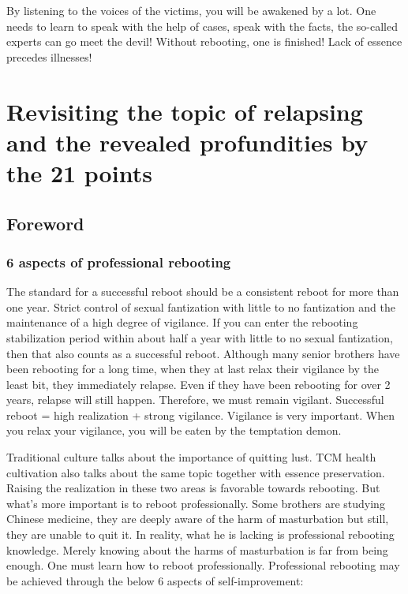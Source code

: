 \documentclass[
]{book}
\begin{document}
By listening to the voices of the victims, you will be awakened by a lot. One needs to learn to speak with the help of cases, speak with the facts, the so-called experts can go meet the devil! Without rebooting, one is finished! Lack of essence precedes illnesses!

\hypertarget{revisiting-the-topic-of-relapsing-and-the-revealed-profundities-by-the-21-points}{%
\chapter{Revisiting the topic of relapsing and the revealed profundities by the 21 points}\label{revisiting-the-topic-of-relapsing-and-the-revealed-profundities-by-the-21-points}}

\hypertarget{foreword-14}{%
\section{Foreword}\label{foreword-14}}

\hypertarget{aspects-of-professional-rebooting}{%
\subsection{6 aspects of professional rebooting}\label{aspects-of-professional-rebooting}}

The standard for a successful reboot should be a consistent reboot for more than one year. Strict control of sexual fantization with little to no fantization and the maintenance of a high degree of vigilance. If you can enter the rebooting stabilization period within about half a year with little to no sexual fantization, then that also counts as a successful reboot. Although many senior brothers have been rebooting for a long time, when they at last relax their vigilance by the least bit, they immediately relapse. Even if they have been rebooting for over 2 years, relapse will still happen. Therefore, we must remain vigilant. Successful reboot = high realization + strong vigilance. Vigilance is very important. When you relax your vigilance, you will be eaten by the temptation demon.

Traditional culture talks about the importance of quitting lust. TCM health cultivation also talks about the same topic together with essence preservation. Raising the realization in these two areas is favorable towards rebooting. But what's more important is to reboot professionally. Some brothers are studying Chinese medicine, they are deeply aware of the harm of masturbation but still, they are unable to quit it. In reality, what he is lacking is professional rebooting knowledge. Merely knowing about the harms of masturbation is far from being enough. One must learn how to reboot professionally. Professional rebooting may be achieved through the below 6 aspects of self-improvement:
\end{document}
